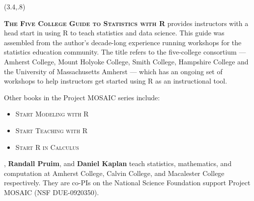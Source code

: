 \documentclass{article}
\begin{document}
{\selectfont







\begin{textblock}{5}(3.4,.8)
\raggedright


\noindent\textsc{\bfseries{The Five College Guide to Statistics with
    R}} provides instructors with a head start in using R to teach
statistics and data science.  This guide was assembled from the
author's decade-long experience running workshops for the statistics education
community.  The title refers to the five-college consortium ---
Amherst College, Mount Holyoke College, Smith College, Hampshire
College and the University of Massachusetts Amherst --- which has an
ongoing set of workshops to help instructors get started using R as an
instructional tool.

\medskip

\noindent Other books in the Project MOSAIC series include:
\begin{itemize}
\item \textsc{Start Modeling with R}
\item \textsc{Start Teaching with R}
\item \textsc{Start R in Calculus}
\end{itemize}

\raggedright
\noindent {}, {\bf Randall Pruim}, and {\bf
Daniel Kaplan} teach statistics, mathematics, and computation at
Amherst College, Calvin College, and Macalester College
respectively.  They are co-PIs on the National Science Foundation
support Project MOSAIC (NSF DUE-0920350).

\medskip


\end{textblock}}
\end{document}

